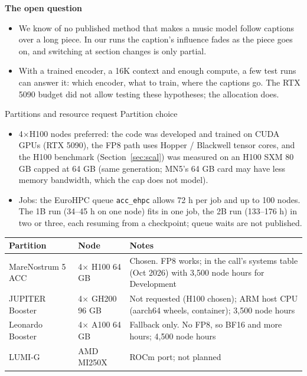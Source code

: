 \documentclass[11pt,a4paper]{article}
\makeatletter
\renewcommand\section{\@startsection{section}{1}{\z@}{-3.2ex \@plus -1ex \@minus -.2ex}{1.8ex \@plus .2ex}%
  {\normalfont\Large\bfseries\color{head}}}
\renewcommand\subsection{\@startsection{subsection}{2}{\z@}{-2.6ex \@plus -1ex \@minus -.2ex}{1.2ex \@plus .2ex}%
  {\normalfont\large\bfseries\color{head}}}
\makeatother
\begin{document}
\medskip
\textbf{The open question}
\begin{itemize}
\item We know of no published method that makes a music model follow captions over a long piece. In our runs the caption's
influence fades as the piece goes on, and switching at section changes is only partial.
\item With a trained encoder, a 16K context and enough compute, a few test runs can answer it: which encoder, what to
train, where the captions go. The RTX 5090 budget did not allow testing these hypotheses; the allocation does.
\end{itemize}
\section{Partitions and resource request}\label{sec:partitions}
\subsection{Partition choice}
\begin{itemize}
\item 4$\times$H100 nodes preferred: the code was developed and trained on CUDA GPUs (RTX 5090), the FP8 path uses
Hopper / Blackwell tensor cores, and the H100 benchmark (Section~\ref{sec:scal}) was measured on an H100 SXM 80 GB capped at 64 GB (same
generation; MN5's 64 GB card may have less memory bandwidth, which the cap does not model).
\item Jobs: the EuroHPC queue \texttt{acc\_ehpc} allows 72 h per job and up to 100 nodes. The 1B run (34--45 h on one
node) fits in one job, the 2B run (133--176 h) in two or three, each resuming from a checkpoint; queue waits are not
published.
\end{itemize}
\begin{tabularx}{\textwidth}{|L{3.0cm}|L{3.0cm}|X|}
\hline
\textbf{Partition} & \textbf{Node} & \textbf{Notes}\\ \hline
MareNostrum 5 ACC & 4$\times$ H100 64 GB & Chosen. FP8 works; in the call's systems table (Oct 2026) with 3,500
node hours for Development\\ \hline
JUPITER Booster & 4$\times$ GH200 96 GB & Not requested (H100 chosen); ARM host CPU (aarch64 wheels, container);
3,500 node hours\\ \hline
Leonardo Booster & 4$\times$ A100 64 GB & Fallback only. No FP8, so BF16 and more hours; 4,500 node hours\\ \hline
LUMI-G & AMD MI250X & ROCm port; not planned\\ \hline
\end{tabularx}
\vspace{4pt}
\end{document}
